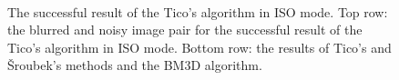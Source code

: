 \documentclass[12pt,notitlepage]{report}
\begin{document}
\begin{figure}[htb]
	  ~
	  ~
  \caption[The successful result of the Tico's algorithm in ISO mode.]{The successful result of the Tico's algorithm in ISO mode. Top row: the blurred and noisy image pair for the successful result of the Tico's algorithm in ISO mode. Bottom row: the results of Tico's and Šroubek's methods and the BM3D algorithm.}
  \label{fig:tico09_iso_success}
\end{figure}



\end{document}
